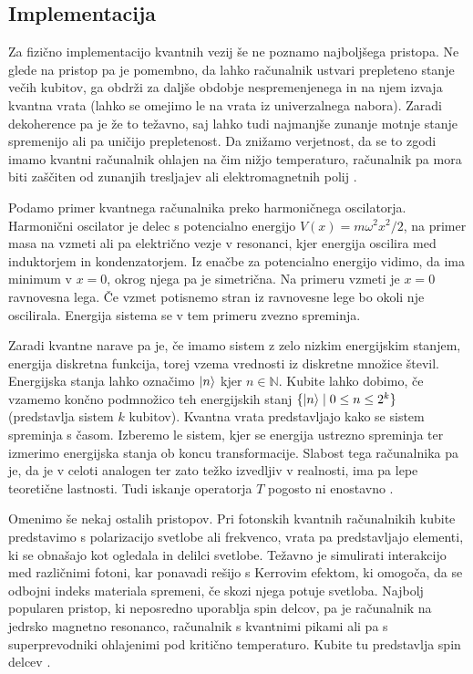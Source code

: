 \documentclass[mat1]{fmfdelo}
\newcommand{\N}{\mathbb N}
\begin{document}
\subsection{Implementacija}
Za fizično implementacijo kvantnih vezij še ne poznamo najboljšega pristopa. Ne glede na pristop pa je pomembno, da lahko računalnik ustvari prepleteno stanje večih kubitov, ga obdrži za daljše obdobje nespremenjenega in na njem izvaja kvantna vrata (lahko se omejimo le na vrata iz univerzalnega nabora). Zaradi dekoherence pa je že to težavno, saj lahko tudi najmanjše zunanje motnje stanje spremenijo ali pa uničijo prepletenost. Da znižamo verjetnost, da se to zgodi imamo kvantni računalnik ohlajen na čim nižjo temperaturo, računalnik pa mora biti zaščiten od zunanjih tresljajev ali elektromagnetnih polij \cite[Poglavje 7.2]{nielsen}. 

Podamo primer kvantnega računalnika preko harmoničnega oscilatorja. Harmonični oscilator je delec s potencialno energijo \(V(x)=m\omega^2x^2/2\), na primer masa na vzmeti ali pa električno vezje v resonanci, kjer energija oscilira med induktorjem in kondenzatorjem. Iz enačbe za potencialno energijo vidimo, da ima minimum v \(x=0\), okrog njega pa je simetrična. Na primeru vzmeti je \(x=0\) ravnovesna lega. Če vzmet potisnemo stran iz ravnovesne lege bo okoli nje oscilirala. Energija sistema se v tem primeru zvezno spreminja.

Zaradi kvantne narave pa je, če imamo sistem z zelo nizkim energijskim stanjem, energija diskretna funkcija, torej vzema vrednosti iz diskretne množice števil. Energijska stanja lahko označimo \(\ket{n}\) kjer \(n\in \N\). Kubite lahko dobimo, če vzamemo končno podmnožico teh energijskih stanj \(\{\ket{ n } \mid 0\leq n \leq 2^k\}\) (predstavlja sistem \(k\) kubitov). Kvantna vrata predstavljajo kako se sistem spreminja s časom. Izberemo le sistem, kjer se energija ustrezno spreminja ter izmerimo energijska stanja ob koncu transformacije. Slabost tega računalnika pa je, da je v celoti analogen ter zato težko izvedljiv v realnosti, ima pa lepe teoretične lastnosti. Tudi iskanje operatorja \(T\) pogosto ni enostavno \cite[Poglavje 7.3]{nielsen}.

Omenimo še nekaj ostalih pristopov. Pri fotonskih kvantnih računalnikih kubite predstavimo s polarizacijo svetlobe ali frekvenco, vrata pa predstavljajo elementi, ki se obnašajo kot ogledala in delilci svetlobe. Težavno je simulirati interakcijo med različnimi fotoni, kar ponavadi rešijo s Kerrovim efektom, ki omogoča, da se odbojni indeks materiala spremeni, če skozi njega potuje svetloba. Najbolj popularen pristop, ki neposredno uporablja spin delcov, pa je računalnik na jedrsko magnetno resonanco, računalnik s kvantnimi pikami ali pa s superprevodniki ohlajenimi pod kritično temperaturo. Kubite tu predstavlja spin delcev \cite{adamowski}.
\end{document}
